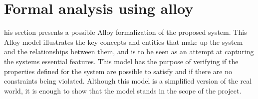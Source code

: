 \documentclass[../RASD.tex]{subfiles}
\begin{document}
    \chapter{Formal analysis using alloy }\label{ch:formal-analysis-using-alloy}
    his section presents a possible Alloy formalization of the proposed system. This Alloy model illustrates the key concepts and entities that make up the system and the relationships between them, and is to be seen as an attempt at capturing the systems essential features. This model has the purpose of verifying if the properties defined for the system are possible to satisfy and if there are no constraints being violated. Although this model is a simplified version of the real world, it is enough to show that the model stands in the scope of the project.
\end{document}
